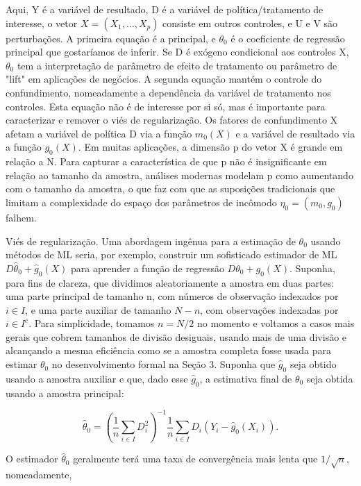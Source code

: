 \documentclass[a4paper,12pt]{article}[abntex2]
\begin{document}
Aqui, Y é a variável de resultado, D é a variável de política/tratamento de interesse, o vetor $X = (X_1, \ldots, X_p)$ consiste em outros controles, e U e V são perturbações. A primeira equação é a principal, e $\theta_0$ é o coeficiente de regressão principal que gostaríamos de inferir. Se D é exógeno condicional aos controles X, $\theta_0$ tem a interpretação de parâmetro de efeito de tratamento ou parâmetro de "lift" em aplicações de negócios. A segunda equação mantém o controle do confundimento, nomeadamente a dependência da variável de tratamento nos controles. Esta equação não é de interesse por si só, mas é importante para caracterizar e remover o viés de regularização. Os fatores de confundimento X afetam a variável de política D via a função $m_0(X)$ e a variável de resultado via a função $g_0(X)$. Em muitas aplicações, a dimensão p do vetor X é grande em relação a N. Para capturar a característica de que p não é insignificante em relação ao tamanho da amostra, análises modernas modelam p como aumentando com o tamanho da amostra, o que faz com que as suposições tradicionais que limitam a complexidade do espaço dos parâmetros de incômodo $\eta_0 = (m_0, g_0)$ falhem.

Viés de regularização. Uma abordagem ingênua para a estimação de $\theta_0$ usando métodos de ML seria, por exemplo, construir um sofisticado estimador de ML $D\hat{\theta}_0 + \hat{g}_0(X)$ para aprender a função de regressão $D\theta_0 + g_0(X)$. Suponha, para fins de clareza, que dividimos aleatoriamente a amostra em duas partes: uma parte principal de tamanho n, com números de observação indexados por $i \in I$, e uma parte auxiliar de tamanho $N - n$, com observações indexadas por $i \in I^c$. Para simplicidade, tomamos $n = N/2$ no momento e voltamos a casos mais gerais que cobrem tamanhos de divisão desiguais, usando mais de uma divisão e alcançando a mesma eficiência como se a amostra completa fosse usada para estimar $\theta_0$ no desenvolvimento formal na Seção 3. Suponha que $\hat{g}_0$ seja obtido usando a amostra auxiliar e que, dado esse $\hat{g}_0$, a estimativa final de $\theta_0$ seja obtida usando a amostra principal:

\begin{equation}
\hat{\theta}_0 = \left(\frac{1}{n} \sum_{i \in I} D_i^2 \right)^{-1} \frac{1}{n} \sum_{i \in I} D_i (Y_i - \hat{g}_0(X_i)).
\end{equation}

O estimador $\hat{\theta}_0$ geralmente terá uma taxa de convergência mais lenta que $1/\sqrt{n}$, nomeadamente,
\end{document}
